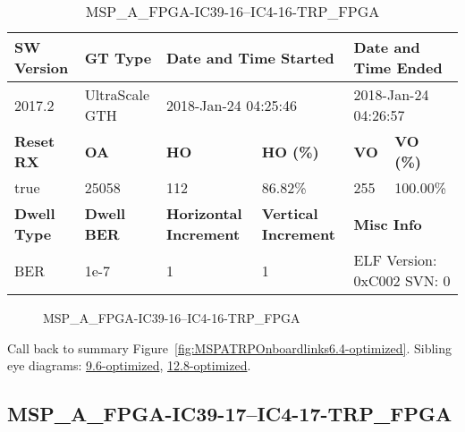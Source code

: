 \begin{table}[h]
\centering
\caption{MSP\_A\_FPGA-IC39-16--IC4-16-TRP\_FPGA}
\label{tab:MSPAFPGAIC3916IC416TRPFPGA6.4-optimized}
\begin{tabular}{@{}|l|l|l|l|l|l|@{}}
\toprule
\textbf{SW Version}                & \textbf{GT Type}   & \multicolumn{2}{l|}{\textbf{Date and Time Started}}            & \multicolumn{2}{l|}{\textbf{Date and Time Ended}}        \\ \midrule
2017.2                       & UltraScale GTH          & \multicolumn{2}{l|}{2018-Jan-24 04:25:46}                   & \multicolumn{2}{l|}{2018-Jan-24 04:26:57}               \\ \midrule
\textbf{Reset RX}                  & \textbf{OA} & \textbf{HO}   & \textbf{HO (\%)} & \textbf{VO} & \textbf{VO (\%)} \\ \midrule
true & 25058        & 112          & 86.82\%        & 255        & 100.00\%       \\ \midrule
\textbf{Dwell Type}                & \textbf{Dwell BER} & \textbf{Horizontal Increment} & \textbf{Vertical Increment}    & \multicolumn{2}{l|}{\textbf{Misc Info}}                  \\ \midrule
BER                            & 1e-7        & 1        & 1           & \multicolumn{2}{l|}{ELF Version: 0xC002 SVN: 0}                         \\ \bottomrule
\end{tabular}
\end{table}

\begin{figure}[h]
\caption{MSP\_A\_FPGA-IC39-16--IC4-16-TRP\_FPGA} \label{fig:MSPAFPGAIC3916IC416TRPFPGA6.4-optimized}
\end{figure}

Call back to summary Figure~\ref{fig:MSPATRPOnboardlinks6.4-optimized}.
Sibling eye diagrams: \hyperref[sec:MSPAFPGAIC3916IC416TRPFPGA9.6-optimized]{9.6-optimized}, \hyperref[sec:MSPAFPGAIC3916IC416TRPFPGA12.8-optimized]{12.8-optimized}.

\clearpage
\newpage


\subsection{MSP\_A\_FPGA-IC39-17--IC4-17-TRP\_FPGA}\label{sec:MSPAFPGAIC3917IC417TRPFPGA6.4-optimized}

